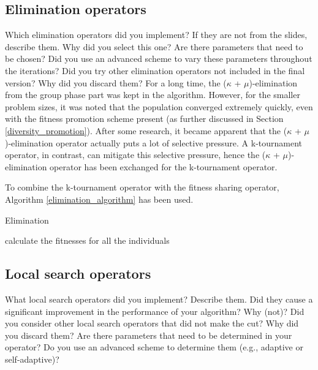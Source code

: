 \documentclass[a4paper,10pt]{article}
\newcommand{\ReplaceMe}[1]{{\color{blue}#1}}
\begin{document}
\subsection{Elimination operators}
\label{elimination}
\ReplaceMe{Which elimination operators did you implement? If they are not from the slides, describe them. Why did you select this one? Are there parameters that need to be chosen? Did you use an advanced scheme to vary these parameters throughout the iterations? Did you try other elimination operators not included in the final version? Why did you discard them?}
For a long time, the ($\kappa$ + $\mu$)-elimination from the group phase part was kept in the algorithm. However, for the smaller problem sizes, it was noted that the population converged extremely quickly, even with the fitness promotion scheme present (as further discussed in Section \ref{diversity_promotion}). After some research, it became apparent that the ($\kappa$ + $\mu$)-elimination operator actually puts a lot of selective pressure. A k-tournament operator, in contrast, can mitigate this selective pressure, hence the ($\kappa$ + $\mu$)-elimination operator has been exchanged for the k-tournament operator.

To combine the k-tournament operator with the fitness sharing operator, Algorithm \ref{elimination_algorithm} has been used.

\begin{algorithm}
\caption{Elimination \cite{eiben_smith}}\label{elimination_algorithm}
\begin{algorithmic}
\State calculate the fitnesses for all the individuals
\ %
\end{algorithmic}
\end{algorithm}


\subsection{Local search operators}
\label{local_search_operator}
\ReplaceMe{What local search operators did you implement? Describe them. Did they cause a significant improvement in the performance of your algorithm? Why (not)? Did you consider other local search operators that did not make the cut? Why did you discard them? Are there parameters that need to be determined in your operator? Do you use an advanced scheme to determine them (e.g., adaptive or self-adaptive)?}
\end{document}
